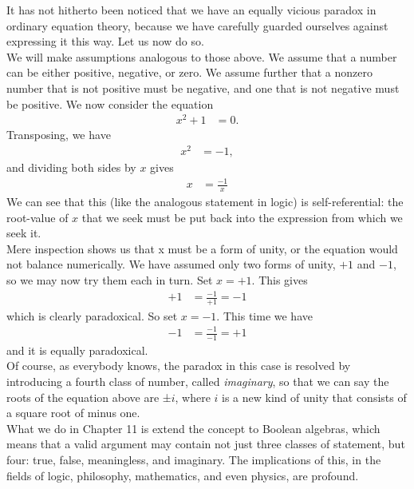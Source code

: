 \documentclass[a4paper]{article}
\theoremstyle{remark}
\begin{document}
It  has  not  hitherto  been  noticed   that   we  have   an   equally   vicious  paradox  in  ordinary  equation  theory,  because  we  have  carefully  guarded  ourselves  against  expressing  it  this  way.  Let  us  now  do  so.  \\

We  will  make  assumptions  analogous  to  those  above.  We  assume  that  a number  can  be  either  positive,  negative,  or  zero.  We  assume  further  that  a  nonzero  number  that  is  not  positive  must  be  negative,  and  one  that  is  not  negative  must  be  positive.  We  now  consider  the  equation 
\begin{align*}
    x^2+1 &= 0.
\end{align*}
Transposing, we have
\begin{align*}
    x^2 &= -1,
\end{align*}
and  dividing  both  sides by  $x$  gives 
\begin{align*}
    x &= \frac{-1}{x}
\end{align*}
We  can  see that  this  (like  the  analogous  statement  in  logic)  is  self-referential:  the  root-value  of  $x$  that  we  seek  must  be  put  back  into  the  expression  from  which  we  seek  it.  \\

Mere  inspection  shows  us  that  x must  be  a  form  of  unity,  or  the equation  would not  balance  numerically.  We  have  assumed  only  two  forms  of  unity,  $+1$  and  $-1$,  so we  may  now  try  them  each  in  turn.  Set  $x=+1$. This  gives 
\begin{align*}
    +1 &= \frac{-1}{+1} = -1
\end{align*}
which  is clearly  paradoxical.  So  set  $x=-1$.  This  time  we  have 
\begin{align*}
    -1 &= \frac{-1}{-1} = +1
\end{align*}
and  it  is  equally  paradoxical.  \\

Of  course,  as  everybody  knows,  the  paradox  in  this  case  is  resolved  by introducing  a fourth  class  of  number,  called   \textit{imaginary},   so  that  we  can  say  the  roots  of  the  equation  above  are  ±$i$, where $i$ is  a new  kind  of unity  that  consists  of  a  square  root  of  minus  one.  \\

What  we  do  in  Chapter  11  is extend  the  concept  to  Boolean  algebras,  which  means  that  a  valid  argument  may  contain  not  just  three  classes  of  statement,  but  four:  true,  false,  meaningless,  and  imaginary.  The  implications  of  this,  in  the  fields  of  logic,   philosophy,   mathematics,   and   even   physics,   are   profound. \\
\end{document}
